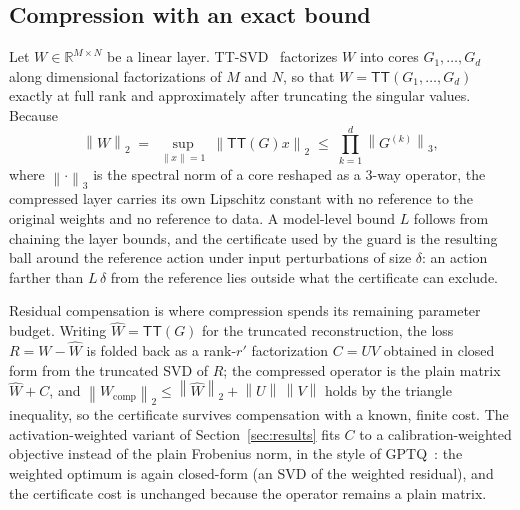 \documentclass[conference,10pt]{IEEEtran}
\newcommand{\norm}[1]{\left\lVert #1 \right\rVert}
\begin{document}
\subsection{Compression with an exact bound}
Let $W \in \mathbb{R}^{M \times N}$ be a linear layer. TT-SVD~\cite{oseledets}
factorizes $W$ into cores $G_1,\dots,G_d$ along dimensional factorizations of
$M$ and $N$, so that $W = \mathsf{TT}(G_1,\dots,G_d)$ exactly at full rank and
approximately after truncating the singular values. Because
\begin{equation}
\norm{W}_{2} \;=\; \sup_{\norm{x}=1}\ \norm{\mathsf{TT}(G)x}_{2}
\;\le\; \prod_{k=1}^{d} \norm{G^{(k)}}_{3},
\label{eq:chain}
\end{equation}
where $\norm{\cdot}_{3}$ is the spectral norm of a core reshaped as a 3-way
operator, the compressed layer carries its own Lipschitz constant with no
reference to the original weights and no reference to data. A model-level
bound $L$ follows from chaining the layer bounds, and the certificate used by
the guard is the resulting ball around the reference action under input
perturbations of size $\delta$: an action farther than $L\,\delta$ from the
reference lies outside what the certificate can exclude.

Residual compensation is where compression spends its remaining parameter
budget. Writing $\widehat W = \mathsf{TT}(G)$ for the truncated
reconstruction, the loss $R = W - \widehat W$ is folded back as a rank-$r'$
factorization $C = UV$ obtained in closed form from the truncated SVD of $R$;
the compressed operator is the plain matrix $\widehat W + C$, and
$\norm{W_{\mathrm{comp}}}_{2} \le \norm{\widehat W}_{2} + \norm{U}\,\norm{V}$
holds by the triangle inequality, so the certificate survives compensation
with a known, finite cost. The activation-weighted variant of
Section~\ref{sec:results} fits $C$ to a calibration-weighted objective
instead of the plain Frobenius norm, in the style of GPTQ~\cite{frantar23}:
the weighted optimum is again closed-form (an SVD of the weighted residual),
and the certificate cost is unchanged because the operator remains a plain
matrix.
\end{document}
